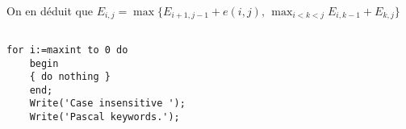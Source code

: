 \documentclass[french]{article}
\begin{document}
\begin{center}
On en déduit que $E_{i,j} =\max\{E_{i+1,j-1} + e(i,j), \,   \displaystyle \max_{i<k<j}  E_{i,k-1} + E_{k,j}\}$
\par\end{center}

\subsection{}
	\begin{lstlisting}[frame=single]  % Start your code-block
	for i:=maxint to 0 do
	begin
	{ do nothing }
	end;
	Write('Case insensitive ');
	Write('Pascal keywords.');
	\end{lstlisting}
\end{document}
